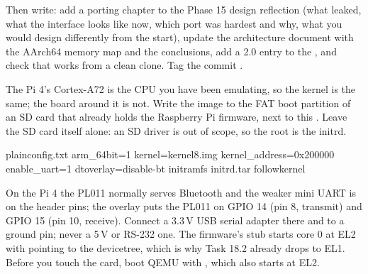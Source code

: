 \documentclass[11pt,a4paper]{article}
\begin{document}
Then write: add a porting chapter to the Phase 15 design reflection (what leaked, what the interface looks like now,
which port was hardest and why, what you would design differently from the start), update the architecture document
with the AArch64 memory map and the  conclusions, add a 2.0 entry to the , and
check that  works from a clean clone. Tag the commit .

The Pi 4's Cortex-A72 is the CPU you have been emulating, so the kernel is the same; the board around it is not.
Write the image to the FAT boot partition of an SD card that already holds the Raspberry Pi firmware, next to this
. Leave the SD card itself alone: an SD driver is out of scope, so the root is the initrd.

\begin{lst}{plain}{config.txt}
arm_64bit=1
kernel=kernel8.img
kernel_address=0x200000
enable_uart=1
dtoverlay=disable-bt
initramfs initrd.tar followkernel
\end{lst}

On the Pi 4 the PL011 normally serves Bluetooth and the weaker mini UART is on the header pins; the
 overlay puts the PL011 on GPIO 14 (pin 8, transmit) and GPIO 15 (pin 10, receive). Connect a
3.3\,V USB serial adapter there and to a ground pin; never a 5\,V or RS-232 one. The firmware's stub starts core 0 at
EL2 with  pointing to the devicetree, which is why Task 18.2 already drops to EL1. Before you touch the card,
boot QEMU with , which also starts at EL2.
\end{document}
